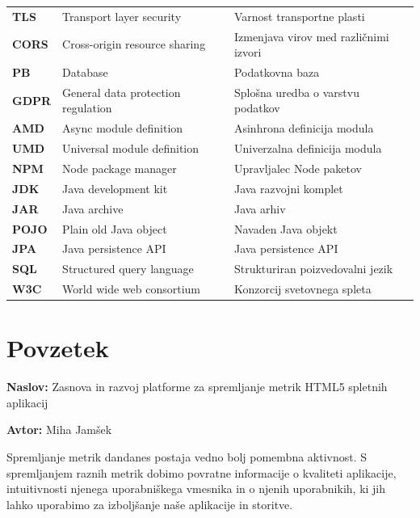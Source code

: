 \documentclass[a4paper, 12pt]{book}
\newcommand{\ttitle}{Zasnova in razvoj platforme za spremljanje metrik HTML5 spletnih aplikacij}
\newcommand{\tauthor}{Miha Jamšek}
\newcommand{\clearemptydoublepage}{\newpage{\pagestyle{empty}\cleardoublepage}}
\begin{document}
\noindent\begin{tabular}{p{}|p{}|p{}}    %
  {\bf TLS}   & Transport layer security  & Varnost transportne plasti \\
  {\bf CORS}   & Cross-origin resource sharing       & Izmenjava virov med različnimi izvori \\
  {\bf PB}   & Database              & Podatkovna baza \\
  {\bf GDPR}   & General data protection regulation      & Splošna uredba o varstvu podatkov  \\
  {\bf AMD}   & Async module definition              & Asinhrona definicija modula \\
  {\bf UMD}   & Universal module definition              & Univerzalna definicija modula \\
  {\bf NPM}   & Node package manager              & Upravljalec Node paketov \\
  {\bf JDK}   & Java development kit              & Java razvojni komplet \\
  {\bf JAR}   & Java archive              & Java arhiv \\
  {\bf POJO}   & Plain old Java object              & Navaden Java objekt \\
  {\bf JPA}   & Java persistence API              & Java persistence API \\
  {\bf SQL}   & Structured query language              & Strukturiran poizvedovalni jezik \\
  {\bf W3C}   & World wide web consortium              & Konzorcij svetovnega spleta \\
\end{tabular}



\clearemptydoublepage

\chapter*{Povzetek}


\noindent\textbf{Naslov:} \ttitle
\bigskip

\noindent\textbf{Avtor:} \tauthor
\bigskip

\noindent Spremljanje metrik dandanes postaja vedno bolj pomembna aktivnost. S spremljanjem raznih metrik  dobimo povratne informacije o kvaliteti aplikacije, intuitivnosti njenega uporabniškega vmesnika in o njenih uporabnikih, ki jih lahko uporabimo za izboljšanje naše aplikacije in storitve.
\end{document}
